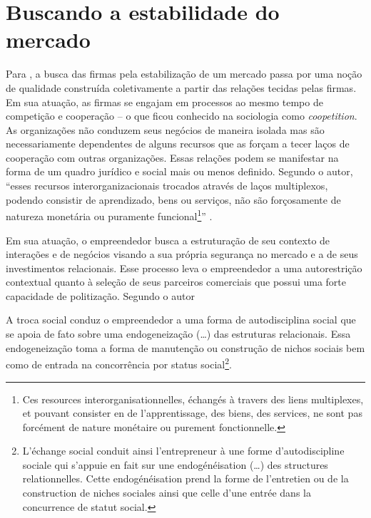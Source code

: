 \documentclass[a4paper, 12pt, openright, oneside, german, french, english, brazil]{abntex2}
\begin{document}
	
	\section{Buscando a estabilidade do mercado}
		
	Para , a busca das firmas pela estabilização de um mercado passa por uma noção de qualidade construída coletivamente a partir das relações tecidas pelas firmas. Em sua atuação, as firmas se engajam em processos ao mesmo tempo de competição e cooperação -- o que ficou conhecido na sociologia como \textit{coopetition}. As organizações não conduzem seus negócios de maneira isolada mas são necessariamente dependentes de alguns recursos que as forçam a tecer laços de cooperação com outras organizações. Essas relações podem se manifestar na forma de um quadro jurídico e social mais ou menos definido. Segundo o autor, ``esses recursos interorganizacionais trocados através de laços multiplexos, podendo consistir de aprendizado, bens ou serviços, não são forçosamente de natureza monetária ou puramente funcional\footnote{Ces resources interorganisationnelles, échangés à travers des liens multiplexes, et pouvant consister en de l'apprentissage, des biens, des services, ne sont pas forcément de nature monétaire ou purement fonctionnelle.}'' \cite[p. 568]{lazega2009theorie}.
	
	Em sua atuação, o empreendedor busca a estruturação de seu contexto de interações e de negócios visando a sua própria segurança no mercado e a de seus investimentos relacionais. Esse processo leva o empreendedor a uma autorestrição contextual quanto à seleção de seus parceiros comerciais que possui uma forte capacidade de politização. Segundo o autor
	
	\begin{citacao}
	A troca social conduz o empreendedor a uma forma de autodisciplina social que se apoia de fato sobre uma endogeneização (\dots) das estruturas relacionais. Essa endogeneização toma a forma de manutenção ou construção de nichos sociais bem como de entrada na concorrência por status social\footnote{L'échange social conduit ainsi l'entrepreneur à une forme d'autodiscipline sociale qui s'appuie en fait sur une endogénéisation (\dots) des structures relationnelles. Cette endogénéisation prend la forme de l'entretien ou de la construction de niches sociales ainsi que celle d'une entrée dans la concurrence de statut social.}. \cite[p. 572]{lazega2009theorie}
	\end{citacao}
	
\end{document}
